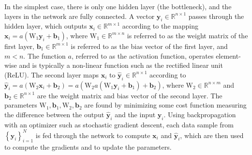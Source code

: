 In the simplest case, there is only one hidden layer (the bottleneck), and the layers in the network are fully connected. A vector $\textbf{y}_i \in \mathbb{R}^{n \times 1}$ passes through the hidden layer, which outputs $\textbf{x}_i \in \mathbb{R}^{m \times 1}$ according to the mapping $\textbf{x}_i = a\left( \text{W}_1 \textbf{y}_i + \textbf{b}_1 \right)$, where $\text{W}_1 \in \mathbb{R}^{m \times n}$ is referred to as the weight matrix of the first layer, $\textbf{b}_1 \in \mathbb{R}^{m \times 1}$ is referred to as the bias vector of the first layer, and $m < n$. The function $a$, referred to as the activation function, operates element-wise and is typically a non-linear function such as the rectified linear unit (ReLU). The second layer maps $\textbf{x}_i$ to $\hat{\textbf{y}}_i \in \mathbb{R}^{n \times 1}$ according to $\hat{\textbf{y}}_i = a\left( \text{W}_2 \textbf{x}_i + \textbf{b}_2 \right) = a\left( \text{W}_2 a\left( \text{W}_1 \textbf{y}_i + \textbf{b}_1 \right)+ \textbf{b}_2 \right)$, where $\text{W}_2 \in \mathbb{R}^{n \times m}$ and $\textbf{b}_2 \in \mathbb{R}^{n \times 1}$ are the weight matrix and bias vector of the second layer. The parameters $\text{W}_1, \textbf{b}_1, \text{W}_2, \textbf{b}_2$ are found by minimizing some cost function measuring the difference between the output $\hat{\textbf{y}}_i$ and the input $\textbf{y}_i$. Using backpropagation with an optimizer such as stochastic gradient descent, each data sample from $\left\{ \textbf{y}_i \right\}_{i=1}^N$ is fed through the network to compute $\textbf{x}_i$ and $\hat{\textbf{y}}_i$, which are then used to compute the gradients and to update the parameters.

